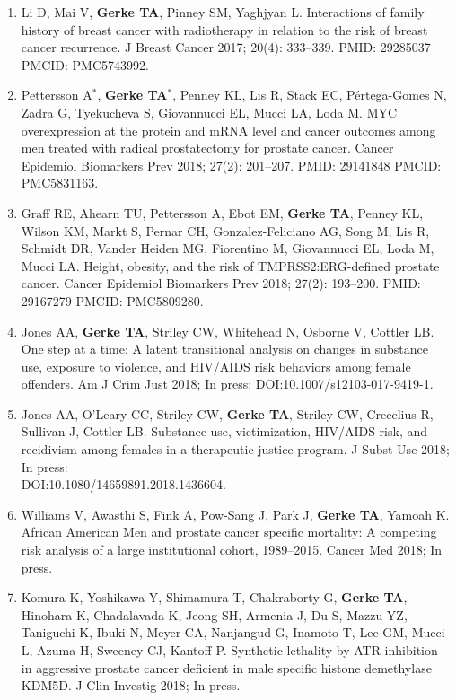 \documentclass[11pt, a4paper]{article} %
\begin{document}
\begin{enumerate}[leftmargin=*]
\item{} Li D, Mai V, {\bf Gerke TA}, Pinney SM, Yaghjyan L. Interactions of family history of breast cancer with radiotherapy in relation to the risk of breast cancer recurrence. J Breast Cancer 2017; 20(4): 333--339. PMID: 29285037 PMCID: PMC5743992. 

\item{} Pettersson A$^*$, {\bf Gerke TA$^*$}, Penney KL, Lis R, Stack EC, P\'{e}rtega-Gomes N, Zadra G, Tyekucheva S, Giovannucci EL, Mucci LA, Loda M. MYC overexpression at the protein and mRNA level and cancer outcomes among men treated with radical prostatectomy for prostate cancer. Cancer Epidemiol Biomarkers Prev 2018; 27(2): 201--207. PMID: 29141848 PMCID: PMC5831163.

\item{} Graff RE, Ahearn TU, Pettersson A, Ebot EM, {\bf Gerke TA}, Penney KL, Wilson KM, Markt S, Pernar CH, Gonzalez-Feliciano AG, Song M, Lis R, Schmidt DR, Vander Heiden MG, Fiorentino M, Giovannucci EL, Loda M, Mucci LA. Height, obesity, and the risk of TMPRSS2:ERG-defined prostate cancer. Cancer Epidemiol Biomarkers Prev 2018; 27(2): 193--200. PMID: 29167279 PMCID: PMC5809280.

\item{} Jones AA, {\bf Gerke TA}, Striley CW, Whitehead N, Osborne V, Cottler LB. One step at a time: A latent transitional analysis on changes in substance use, exposure to violence, and HIV/AIDS risk behaviors among female offenders. Am J Crim Just 2018; In press: DOI:10.1007/s12103-017-9419-1.

\item{} Jones AA, O'Leary CC, Striley CW, {\bf Gerke TA}, Striley CW, Crecelius R, Sullivan J, Cottler LB. Substance use, victimization, HIV/AIDS risk, and recidivism among females in a therapeutic justice program. J Subst Use 2018; In press:\\DOI:10.1080/14659891.2018.1436604.

\item{} Williams V, Awasthi S, Fink A, Pow-Sang J, Park J, {\bf Gerke TA}, Yamoah K. African American Men and prostate cancer specific mortality: A competing risk analysis of a large institutional cohort, 1989--2015. Cancer Med 2018; In press. 

\item{} Komura K, Yoshikawa Y, Shimamura T, Chakraborty G, {\bf Gerke TA}, Hinohara K, Chadalavada K, Jeong SH,  Armenia J, Du S, Mazzu YZ, Taniguchi K, Ibuki N, Meyer CA, Nanjangud G, Inamoto T, Lee GM, Mucci L, Azuma H, Sweeney CJ, Kantoff P. Synthetic lethality by ATR inhibition in aggressive prostate cancer deficient in male specific histone demethylase KDM5D. J Clin Investig 2018; In press. 


\end{enumerate}
\end{document}
